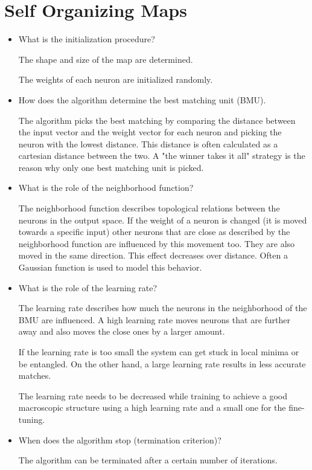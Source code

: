 \documentclass[a4paper, 11pt]{article}
\begin{document}
\section{Self Organizing Maps}
\begin{itemize}
  \item What is the initialization procedure?

    The shape and size of the map are determined.

    The weights of each neuron are initialized randomly.

  \item How does the algorithm determine the best matching unit (BMU).

    The algorithm picks the best matching by comparing the distance between the input vector and the weight vector for each neuron and picking the neuron with the lowest distance.
    This distance is often calculated as a cartesian distance between the two.
    A "the winner takes it all" strategy is the reason why only one best matching unit is picked.

  \item What is the role of the neighborhood function?

    The neighborhood function describes topological relations between the neurons in the output space.
    If the weight of a neuron is changed (it is moved towards a specific input) other neurons that are close as described by the neighborhood function are influenced by this movement too.
    They are also moved in the same direction.
    This effect decreases over distance.
    Often a Gaussian function is used to model this behavior.

  \item What is the role of the learning rate?

    The learning rate describes how much the neurons in the neighborhood of the BMU are influenced.
    A high learning rate moves neurons that are further away and also moves the close ones by a larger amount.

    If the learning rate is too small the system can get stuck in local minima or be entangled.
    On the other hand, a large learning rate results in less accurate matches.

    The learning rate needs to be decreased while training to achieve a good macroscopic structure using a high learning rate and a small one for the fine-tuning.

  \item When does the algorithm stop (termination criterion)?

    The algorithm can be terminated after a certain number of iterations.
\end{itemize}
\end{document}
